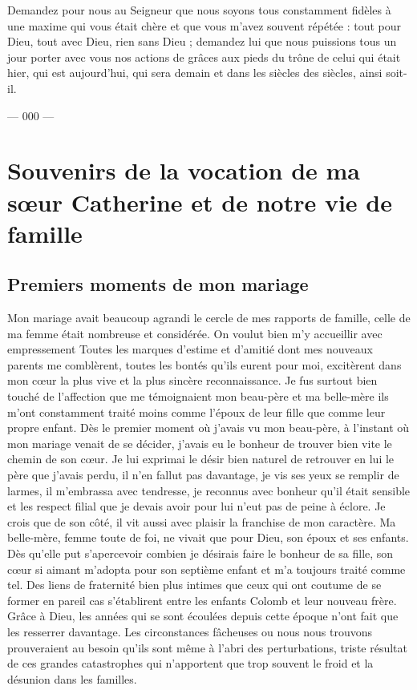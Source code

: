 \documentclass[11pt,a4paper]{report}
\begin{document}
Demandez pour nous au Seigneur que nous soyons tous constamment fidèles à une maxime qui vous était chère et que vous m'avez souvent répétée : tout pour Dieu, tout avec Dieu, rien sans Dieu ; demandez lui que nous puissions tous un jour porter avec vous nos actions de grâces aux pieds du trône de celui qui était hier, qui est aujourd'hui, qui sera demain et dans les siècles des siècles, ainsi soit-il.

\vspace{1cm}

\begin{center}
--- 000 ---
\end{center}

\chapter{Souvenirs de la vocation de ma sœur Catherine et de notre vie de famille}

\section*{Premiers moments de mon mariage}

Mon mariage avait beaucoup agrandi le cercle de mes rapports de famille, celle de ma femme était nombreuse et considérée. On voulut bien m'y accueillir avec empressement Toutes les marques d'estime et d'amitié dont mes nouveaux parents me comblèrent, toutes les bontés qu'ils eurent pour moi, excitèrent dans mon cœur la plus vive et la plus sincère reconnaissance. Je fus surtout bien touché de l'affection que me témoignaient mon beau-père et ma belle-mère ils m'ont constamment traité moins comme l'époux de leur fille que comme leur propre enfant. Dès le premier moment où j'avais vu mon beau-père, à l'instant où mon mariage venait de se décider, j'avais eu le bonheur de trouver bien vite le chemin de son cœur. Je lui exprimai le désir bien naturel de retrouver en lui le père que j'avais perdu, il n'en fallut pas davantage, je vis ses yeux se remplir de larmes, il m'embrassa avec tendresse, je reconnus avec bonheur qu'il était sensible et les respect filial que je devais avoir pour lui n'eut pas de peine à éclore. Je crois que de son côté, il vit aussi avec plaisir la franchise de mon caractère. Ma belle-mère, femme toute de foi, ne vivait que pour Dieu, son époux et ses enfants. Dès qu'elle put s'apercevoir combien je désirais faire le bonheur de sa fille, son cœur si aimant m'adopta pour son septième enfant et m'a toujours traité comme tel. Des liens de fraternité bien plus intimes que ceux qui ont coutume de se former en pareil cas s'établirent entre les enfants Colomb et leur nouveau frère. Grâce à Dieu, les années qui se sont écoulées depuis cette époque n'ont fait que les resserrer davantage. Les circonstances fâcheuses ou nous nous trouvons prouveraient au besoin qu'ils sont même à l'abri des perturbations, triste résultat de ces grandes catastrophes qui n'apportent que trop souvent le froid et la désunion dans les familles.
\end{document}
